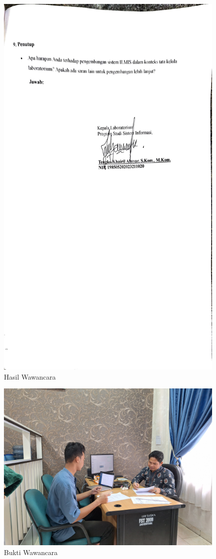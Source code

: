 \begin{figure}[h]
	\centering
	\includegraphics[width=0.82\linewidth]{konten/gambar/wawancara/wawancara_5.jpg}
	\caption{Hasil Wawancara}
	\label{fig:hasil-wawancara}
\end{figure}
\begin{figure}[h]
	\centering
	\includegraphics[width=0.82\linewidth]{konten/gambar/wawancara.jpg}
	\caption{Bukti Wawancara}
	\label{fig:hasil-wawancara}
\end{figure}

